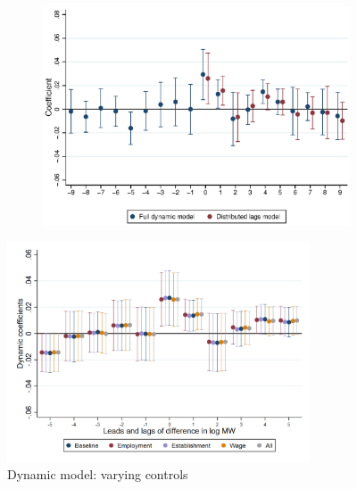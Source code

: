 \documentclass{article}
\begin{document}
\begin{figure}[htb!]
\begin{subfigure}[b]{0.5\textwidth}
		\includegraphics[width = \textwidth]
		{../../analysis/first_differences/output/fd_models_coeffs_w9.eps}
	\end{subfigure}
\end{figure}

\begin{figure} \centering
	\caption{Dynamic model: varying controls}
	\includegraphics[width = 0.8\textwidth]{../../analysis/first_differences/output/fd_models_control.png}
\end{figure} 
\end{document}
